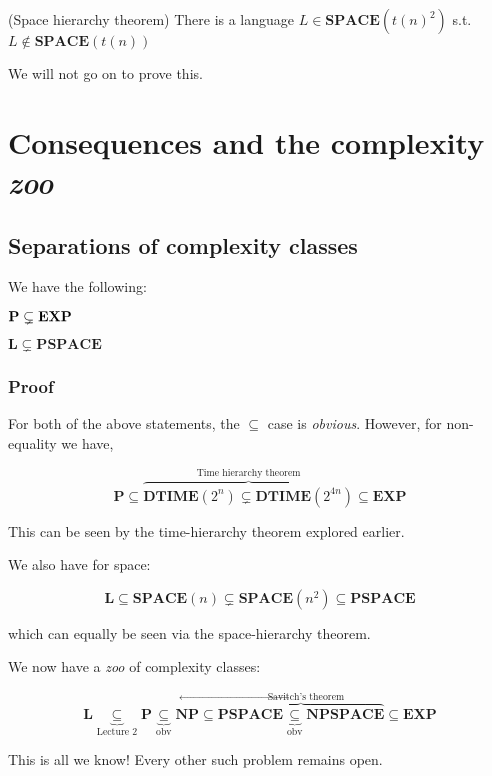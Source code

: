 \documentclass{article}
\begin{document}
\begin{theorem}(Space hierarchy theorem)
  There is a language $L \in \mathbf{SPACE}(t(n)^{2})$ s.t. $L\notin \mathbf{SPACE}(t(n))$
\end{theorem}

We will not go on to prove this.

\section{Consequences and the complexity \textit{zoo} }

\subsection{Separations of complexity classes}
\label{subsec:separations}

\begin{theorem}
  We have the following:

  $\bf P \subsetneq EXP$

  $\mathbf{L} \subsetneq \mathbf{PSPACE}$
\end{theorem}

\subsubsection{Proof}

For both of the above statements, the $\subseteq$ case is \textit{obvious}. However, for non-equality we have,

\[
  \mathbf{P} \subseteq \overbrace{\mathbf{DTIME}(2^{n}) \subsetneq \mathbf{DTIME}(2^{4n})}^{\text{Time hierarchy theorem}} \subseteq \mathbf{EXP}
\]

This can be seen by the time-hierarchy theorem explored earlier.

We also have for space:

\[
  \mathbf{L} \subseteq \mathbf{SPACE}(n) \subsetneq \mathbf{SPACE}(n^{2}) \subseteq \mathbf{PSPACE}
\]

which can equally be seen via the space-hierarchy theorem.


We now have a \textit{zoo} of complexity classes:

\[
  \mathbf{L} \underbrace{\subseteq}_{\text{Lecture 2}} \mathbf{P} \underbrace{\subseteq}_{\text{obv}} \mathbf{NP} \subseteq \overbrace{\mathbf{PSPACE} \underbrace{\subseteq}_{\text{obv}}\mathbf{NPSPACE}}^{ \leftarrow \text{Savitch's theorem}} \subseteq \mathbf{EXP}
\]

This is all we know! Every other such problem remains open.
\end{document}
